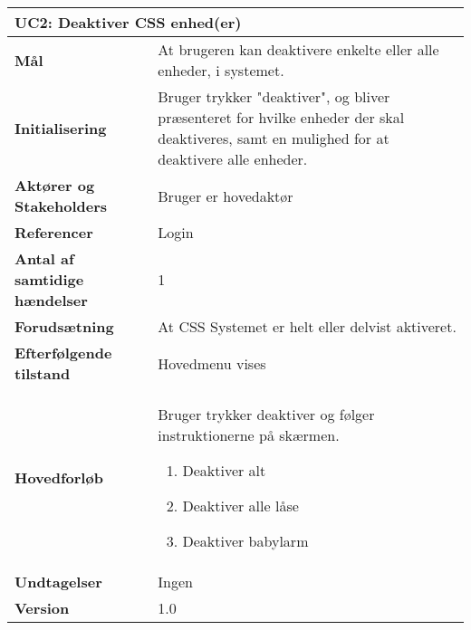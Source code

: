 \begin{table}[H] \centering
\begin{tabular}{|p{6cm}|p{8cm}|}
	\hline
\multicolumn{2}{|l|}{\textbf{UC2: Deaktiver CSS enhed(er)}} \\\hline
\textbf{Mål}	&
At brugeren kan deaktivere enkelte eller alle enheder, i systemet.
\\\hline
\textbf{Initialisering} &
Bruger trykker "deaktiver", og bliver
præsenteret for hvilke enheder der skal deaktiveres, samt en mulighed for at deaktivere alle
enheder. 
\\\hline
\textbf{Aktører og Stakeholders}	&
Bruger er hovedaktør
\\\hline
\textbf{Referencer} &
Login
\\\hline
\textbf{Antal af samtidige hændelser} &
1
\\\hline
\textbf{Forudsætning} &
At CSS Systemet er helt eller delvist aktiveret.
\\\hline
\textbf{Efterfølgende tilstand} &
Hovedmenu vises
\\\hline
\textbf{Hovedforløb}	&
Bruger trykker deaktiver og følger instruktionerne på skærmen.
\begin{enumerate}
\item Deaktiver alt
\item Deaktiver alle låse
\item Deaktiver babylarm
\end{enumerate}
\\\hline
\textbf{Undtagelser}	&
Ingen
\\\hline
\textbf{Version}		&1.0 \\\hline
	\end{tabular}
	\label{tab:UC2} 
\end{table}